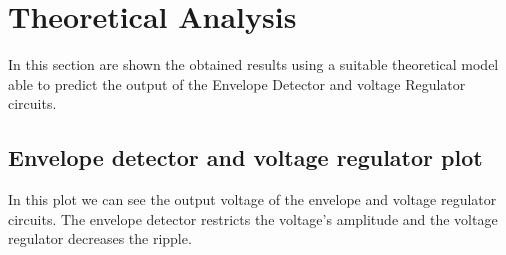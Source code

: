 \section{Theoretical Analysis}
\label{sec:analysis}

In this section are shown the obtained results using a suitable theoretical model able to predict the output of the Envelope Detector and voltage Regulator circuits.

\subsection{Envelope detector and voltage regulator plot}
In this plot we can see the output voltage of the envelope and voltage regulator circuits. The envelope detector restricts the voltage's amplitude and the voltage regulator decreases the ripple. \par
